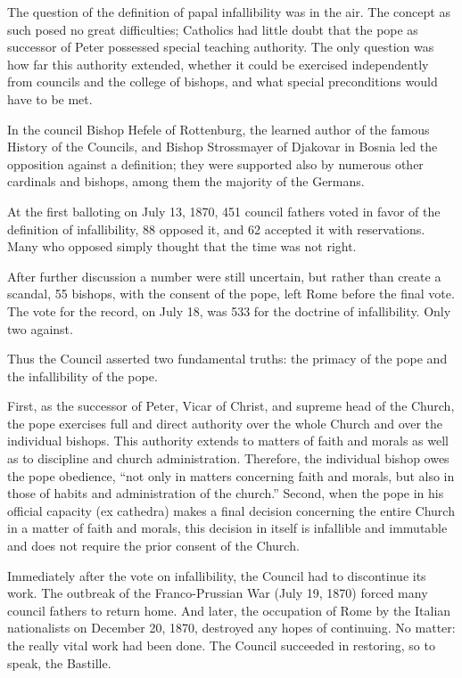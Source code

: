 The question of the definition of papal infallibility was in the air. The concept as such posed no
great difficulties; Catholics had little doubt that the pope as successor of Peter possessed special
teaching authority. The only question was how far this authority extended, whether it could be
exercised independently from councils and the college of bishops, and what special preconditions
would have to be met.

In the council Bishop Hefele of Rottenburg, the learned author of the famous History of the
Councils, and Bishop Strossmayer of Djakovar in Bosnia led the opposition against a definition; they
were supported also by numerous other cardinals and bishops, among them the majority of the Germans.

At the first balloting on July 13, 1870, 451 council fathers voted in favor of the definition of
infallibility, 88 opposed it, and 62 accepted it with reservations. Many who opposed simply thought
that the time was not right.

After further discussion a number were still uncertain, but rather than create a scandal, 55
bishops, with the consent of the pope, left Rome before the final vote. The vote for the record, on
July 18, was 533 for the doctrine of infallibility. Only two against.

Thus the Council asserted two fundamental truths: the primacy of the pope and the infallibility of
the pope.

First, as the successor of Peter, Vicar of Christ, and supreme head of the Church, the pope
exercises full and direct authority over the whole Church and over the individual bishops. This
authority extends to matters of faith and morals as well as to discipline and church administration.
Therefore, the individual bishop owes the pope obedience, “not only in matters concerning faith and
morals, but also in those of habits and administration of the church.” Second, when the pope in his
official capacity (ex cathedra) makes a final decision concerning the entire Church in a matter of
faith and morals, this decision in itself is infallible and immutable and does not require the prior
consent of the Church.

Immediately after the vote on infallibility, the Council had to discontinue its work. The outbreak
of the Franco-Prussian War (July 19, 1870) forced many council fathers to return home. And later,
the occupation of Rome by the Italian nationalists on December 20, 1870, destroyed any hopes of
continuing. No matter: the really vital work had been done. The Council succeeded in restoring, so
to speak, the Bastille.

